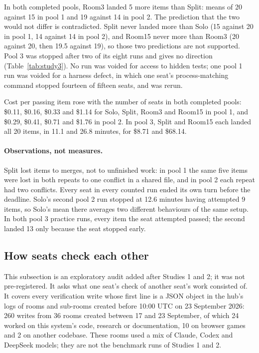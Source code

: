 In both completed pools, Room3 landed 5 more items than Split: means of 20 against 15 in pool 1 and 19 against 14 in pool 2. The prediction that the two would not differ is contradicted. Split never landed more than Solo (15 against 20 in pool 1, 14 against 14 in pool 2), and Room15 never more than Room3 (20 against 20, then 19.5 against 19), so those two predictions are not supported. Pool 3 was stopped after two of its eight runs and gives no direction (Table~\ref{tab:study3}). No run was voided for access to hidden tests; one pool 1 run was voided for a harness defect, in which one seat's process-matching command stopped fourteen of fifteen seats, and was rerun.

\begin{table}[t]
\centering
\caption{Study 3: items passing (of 20) in each counted run, with the minutes the run took, and cost per passing item over both repeats. Pool 3 was stopped after two runs.}
\label{tab:study3}
\resizebox{\linewidth}{!}{}
\end{table}

Cost per passing item rose with the number of seats in both completed pools: \$0.11, \$0.16, \$0.33 and \$1.14 for Solo, Split, Room3 and Room15 in pool 1, and \$0.29, \$0.41, \$0.71 and \$1.76 in pool 2. In pool 3, Split and Room15 each landed all 20 items, in 11.1 and 26.8 minutes, for \$8.71 and \$68.14.

\paragraph{Observations, not measures.} Split lost items to merges, not to unfinished work: in pool 1 the same five items were lost in both repeats to one conflict in a shared file, and in pool 2 each repeat had two conflicts. Every seat in every counted run ended its own turn before the deadline. Solo's second pool 2 run stopped at 12.6 minutes having attempted 9 items, so Solo's mean there averages two different behaviours of the same setup. In both pool 3 practice runs, every item the seat attempted passed; the second landed 13 only because the seat stopped early.

\subsection{How seats check each other}
\label{sec:results-review}

This subsection is an exploratory audit added after Studies 1 and 2; it was not pre-registered. It asks what one seat's check of another seat's work consisted of. It covers every verification write whose first line is a JSON object in the hub's logs of rooms and sub-rooms created before 10:00 UTC on 23 September 2026: 260 writes from 36 rooms created between 17 and 23 September, of which 24 worked on this system's code, research or documentation, 10 on browser games and 2 on another codebase. These rooms used a mix of Claude, Codex and DeepSeek models; they are not the benchmark runs of Studies 1 and 2.

